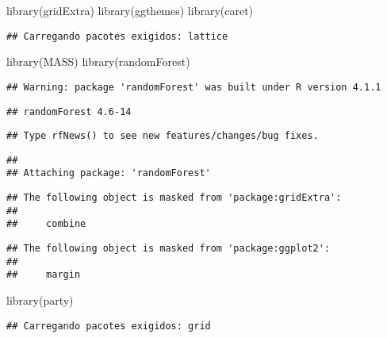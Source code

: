 \documentclass[
]{article}
\newenvironment{Shaded}{\begin{snugshade}}{\end{snugshade}}
\newcommand{\FunctionTok}[1]{\textcolor[rgb]{0.00,0.00,0.00}{#1}}
\newcommand{\NormalTok}[1]{#1}
\begin{document}
\begin{Shaded}
\begin{Highlighting}[]
\FunctionTok{library}\NormalTok{(gridExtra)}
\FunctionTok{library}\NormalTok{(ggthemes)}
\FunctionTok{library}\NormalTok{(caret)}
\end{Highlighting}
\end{Shaded}

\begin{verbatim}
## Carregando pacotes exigidos: lattice
\end{verbatim}

\begin{Shaded}
\begin{Highlighting}[]
\FunctionTok{library}\NormalTok{(MASS)}
\FunctionTok{library}\NormalTok{(randomForest)}
\end{Highlighting}
\end{Shaded}

\begin{verbatim}
## Warning: package 'randomForest' was built under R version 4.1.1
\end{verbatim}

\begin{verbatim}
## randomForest 4.6-14
\end{verbatim}

\begin{verbatim}
## Type rfNews() to see new features/changes/bug fixes.
\end{verbatim}

\begin{verbatim}
## 
## Attaching package: 'randomForest'
\end{verbatim}

\begin{verbatim}
## The following object is masked from 'package:gridExtra':
## 
##     combine
\end{verbatim}

\begin{verbatim}
## The following object is masked from 'package:ggplot2':
## 
##     margin
\end{verbatim}

\begin{Shaded}
\begin{Highlighting}[]
\FunctionTok{library}\NormalTok{(party)}
\end{Highlighting}
\end{Shaded}

\begin{verbatim}
## Carregando pacotes exigidos: grid
\end{verbatim}
\end{document}
